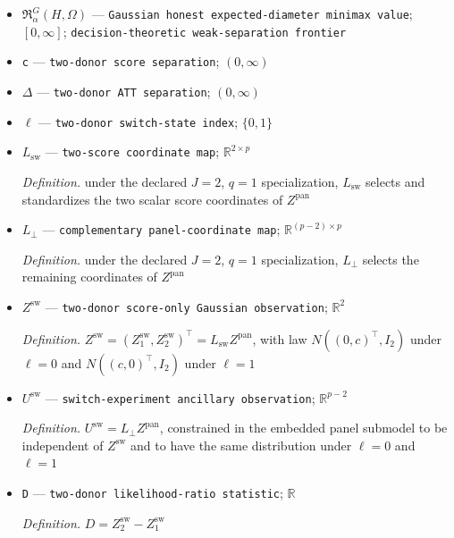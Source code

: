 \documentclass{article}
\begin{document}
\begin{itemize}
  \par\smallskip\noindent\emph{Definition.} the common \(b_j\) among labels satisfying \(h_j=0\)
  \item \(\mathfrak R_{\alpha}^{G}(H,\Omega)\) --- \texttt{Gaussian honest expected-\allowbreak{}diameter minimax value}; \([0,\infty]\); \texttt{decision-\allowbreak{}theoretic weak-\allowbreak{}separation frontier}
  \item \texttt{c} --- \texttt{two-\allowbreak{}donor score separation}; \((0,\infty)\)
  \item \(\Delta\) --- \texttt{two-\allowbreak{}donor ATT separation}; \((0,\infty)\)
  \item \(\ell\) --- \texttt{two-\allowbreak{}donor switch-\allowbreak{}state index}; \(\{0,1\}\)
  \item \(L_{\mathrm{sw}}\) --- \texttt{two-\allowbreak{}score coordinate map}; \(\mathbb R^{2\times p}\)
  \par\smallskip\noindent\emph{Definition.} under the declared \(J=2\), \(q=1\) specialization, \(L_{\mathrm{sw}}\) selects and standardizes the two scalar score coordinates of \(Z^{\mathrm{pan}}\)
  \item \(L_{\perp}\) --- \texttt{complementary panel-\allowbreak{}coordinate map}; \(\mathbb R^{(p-2)\times p}\)
  \par\smallskip\noindent\emph{Definition.} under the declared \(J=2\), \(q=1\) specialization, \(L_{\perp}\) selects the remaining coordinates of \(Z^{\mathrm{pan}}\)
  \item \(Z^{\mathrm{sw}}\) --- \texttt{two-\allowbreak{}donor score-\allowbreak{}only Gaussian observation}; \(\mathbb R^2\)
  \par\smallskip\noindent\emph{Definition.} \(Z^{\mathrm{sw}}=(Z_1^{\mathrm{sw}},Z_2^{\mathrm{sw}})^{\top}=L_{\mathrm{sw}}Z^{\mathrm{pan}}\), with law \(N((0,c)^{\top},I_2)\) under \(\ell=0\) and \(N((c,0)^{\top},I_2)\) under \(\ell=1\)
  \item \(U^{\mathrm{sw}}\) --- \texttt{switch-\allowbreak{}experiment ancillary observation}; \(\mathbb R^{p-2}\)
  \par\smallskip\noindent\emph{Definition.} \(U^{\mathrm{sw}}=L_{\perp}Z^{\mathrm{pan}}\), constrained in the embedded panel submodel to be independent of \(Z^{\mathrm{sw}}\) and to have the same distribution under \(\ell=0\) and \(\ell=1\)
  \item \texttt{D} --- \texttt{two-\allowbreak{}donor likelihood-\allowbreak{}ratio statistic}; \(\mathbb R\)
  \par\smallskip\noindent\emph{Definition.} \(D=Z_2^{\mathrm{sw}}-Z_1^{\mathrm{sw}}\)

\end{itemize}
\end{document}
